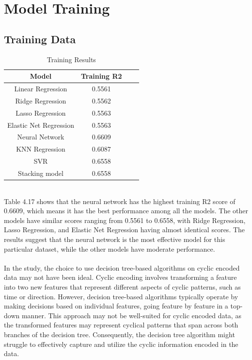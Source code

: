 \documentclass{report}
\begin{document}
\section{Model Training}
\label{sec:training}
\subsection{Training Data}
\label{sec:training_data}
\begin{table}[h]
\centering
\begin{tabular}{|c|c|c|c|}
\hline
\textbf{Model} & \textbf{Training R2} \\ \hline
Linear Regression  & 0.5561 \\ \hline
Ridge Regression & 0.5562 \\ \hline
Lasso Regression& 0.5563 \\ \hline
Elastic Net Regression  & 0.5563 \\ \hline
Neural Network & 0.6609 \\ \hline
KNN Regression  & 0.6087 \\ \hline
SVR  & 0.6558 \\ \hline
Stacking model  & 0.6558 \\ \hline
\end{tabular}
\caption{Training Results}
\end{table}  \hfill \break 
\\
Table 4.17 shows that the neural network has the highest training R2 score of 0.6609, which means it has the best performance among all the models. The other models have similar scores ranging from 0.5561 to 0.6558, with Ridge Regression, Lasso Regression, and Elastic Net Regression having almost identical scores. The results suggest that the neural network is the most effective model for this particular dataset, while the other models have moderate performance. \\
\\
In the study\cite{prj}, the choice to use decision tree-based algorithms on cyclic encoded data may not have been ideal. Cyclic encoding involves transforming a feature into two new features that represent different aspects of cyclic patterns, such as time or direction. However, decision tree-based algorithms typically operate by making decisions based on individual features, going feature by feature in a top-down manner. This approach may not be well-suited for cyclic encoded data, as the transformed features may represent cyclical patterns that span across both branches of the decision tree. Consequently, the decision tree algorithm might struggle to effectively capture and utilize the cyclic information encoded in the data.
\end{document}
